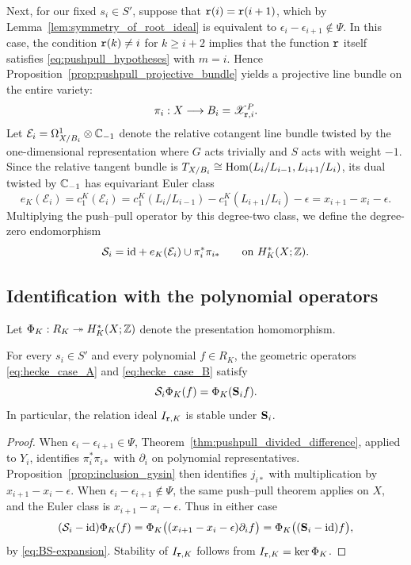Next, for our fixed $s_i\in S'$, suppose that $\mathtt r(i)=\mathtt r(i+1)$, which by Lemma~\ref{lem:symmetry_of_root_ideal} is equivalent to $\epsilon_i-\epsilon_{i+1}\notin\Psi$.
In this case, the condition $\mathtt r(k)\neq i$ for $k\geq i+2$ implies that the function $\mathtt r$ itself
satisfies \eqref{eq:pushpull_hypotheses} with $m=i$.
Hence Proposition~\ref{prop:pushpull_projective_bundle} yields a projective line bundle on the entire variety:
\[
  \pi_i:X\longrightarrow B_i=\mathscr X_{\mathtt r,i}^P.
\]
Let $\mathcal E_i=\Omega^1_{X/B_i}\otimes\mathbb C_{-1}$ denote the relative cotangent line bundle
twisted by the one-dimensional representation where $G$ acts trivially and $S$ acts with weight $-1$.
Since the relative tangent bundle is $T_{X/B_i}\cong\operatorname{Hom}(L_i/L_{i-1},L_{i+1}/L_i)$, its dual twisted by $\mathbb C_{-1}$ has
equivariant Euler class
\[
  e_K(\mathcal E_i)=c_1^K(\mathcal E_i)
  =c_1^K(L_i/L_{i-1})-c_1^K(L_{i+1}/L_i)-\epsilon
  =x_{i+1}-x_i-\epsilon.
\]
Multiplying the push--pull operator by this degree-two class, we define the degree-zero endomorphism
\begin{equation}\label{eq:hecke_case_B}
  \mathcal S_i=\mathrm{id}+e_K(\mathcal E_i)\cup\pi_i^*\pi_{i*}
  \qquad\text{on }H^*_K(X;\mathbb Z).
\end{equation}

\subsection{Identification with the polynomial operators}

Let $\Phi_K:R_K\twoheadrightarrow H_K^*(X;\mathbb Z)$ denote the presentation homomorphism.

\begin{theorem}\label{thm:geometric_hecke}
For every $s_i\in S'$ and every polynomial $f\in R_K$, the geometric operators
\eqref{eq:hecke_case_A} and \eqref{eq:hecke_case_B} satisfy
\[
  \mathcal S_i\Phi_K(f)=\Phi_K(\mathbf S_i f).
\]
In particular, the relation ideal $I_{\mathtt r,K}$ is stable under $\mathbf S_i$.
\end{theorem}

\begin{proof}
When $\epsilon_i-\epsilon_{i+1}\in\Psi$, Theorem~\ref{thm:pushpull_divided_difference},
applied to $Y_i$, identifies $\pi_i^*\pi_{i*}$ with $\partial_i$ on polynomial representatives.
Proposition~\ref{prop:inclusion_gysin}
then identifies $j_{i*}$ with multiplication by $x_{i+1}-x_i-\epsilon$.
When $\epsilon_i-\epsilon_{i+1}\notin\Psi$, the same push--pull theorem
applies on $X$, and the Euler class is $x_{i+1}-x_i-\epsilon$.
Thus in either case
\[
 (\mathcal S_i-\mathrm{id})\Phi_K(f)
 =\Phi_K\bigl((x_{i+1}-x_i-\epsilon)\partial_i f\bigr)
 =\Phi_K\bigl((\mathbf S_i-\mathrm{id})f\bigr),
\]
by \eqref{eq:BS-expansion}. Stability of $I_{\mathtt r,K}$ follows from $I_{\mathtt r,K}=\ker\Phi_K$.
\end{proof}

